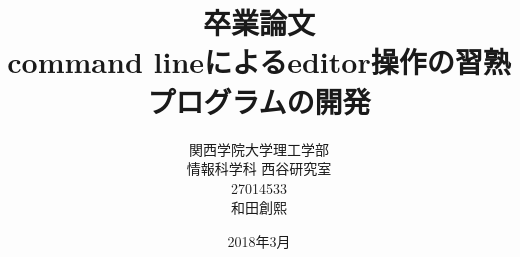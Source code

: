 \title{卒業論文\\command lineによるeditor操作の習熟プログラムの開発}
\author{関西学院大学理工学部\\情報科学科 西谷研究室\\27014533\\和田創熙 }
\date{2018年3月}

\maketitle
\newpage
